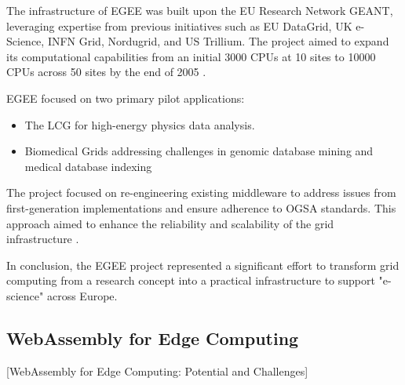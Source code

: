 The infrastructure of \ac{EGEE} was built upon the EU Research Network GEANT, leveraging expertise from previous initiatives such as EU DataGrid, UK e-Science, INFN Grid, Nordugrid, and US Trillium. The project aimed to expand its computational capabilities from an initial 3000 CPUs at 10 sites to 10000 CPUs across 50 sites by the end of 2005 \cite{relatedwork:egee}.

\ac{EGEE} focused on two primary pilot applications: 
\begin{itemize}
  \item The \ac{LCG} for high-energy physics data analysis.
  \item Biomedical Grids addressing challenges in genomic database mining and medical database indexing
\end{itemize}
The project focused on re-engineering existing middleware to address issues from first-generation implementations and ensure adherence to \ac{OGSA} standards. This approach aimed to enhance the reliability and scalability of the grid infrastructure \cite{relatedwork:egee}.

In conclusion, the \ac{EGEE} project represented a significant effort to transform grid computing from a research concept into a practical infrastructure to support "e-science" across Europe.

\subsection{WebAssembly for Edge Computing}
\label{subsec:background:related_work:wasmedgecomputing}
[WebAssembly for Edge Computing: Potential and Challenges] \cite{relatedwork:wasmedgecomputing}